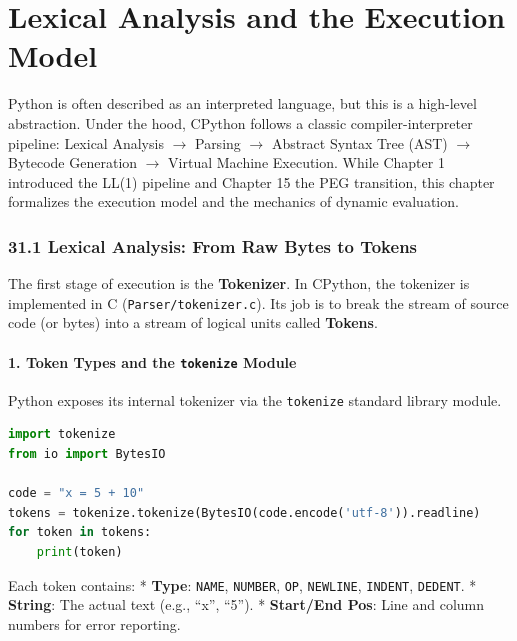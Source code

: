 \hypertarget{lexical-analysis-and-the-execution-model}{%
\chapter{Lexical Analysis and the Execution
Model}\label{lexical-analysis-and-the-execution-model}}

Python is often described as an interpreted language, but this is a
high-level abstraction. Under the hood, CPython follows a classic
compiler-interpreter pipeline: Lexical Analysis \(\rightarrow\) Parsing
\(\rightarrow\) Abstract Syntax Tree (AST) \(\rightarrow\) Bytecode
Generation \(\rightarrow\) Virtual Machine Execution. While Chapter 1
introduced the LL(1) pipeline and Chapter 15 the PEG transition, this
chapter formalizes the execution model and the mechanics of dynamic
evaluation.

\hypertarget{lexical-analysis-from-raw-bytes-to-tokens}{%
\subsection{31.1 Lexical Analysis: From Raw Bytes to
Tokens}\label{lexical-analysis-from-raw-bytes-to-tokens}}

The first stage of execution is the \textbf{Tokenizer}. In CPython, the
tokenizer is implemented in C
(\passthrough{\lstinline!Parser/tokenizer.c!}). Its job is to break the
stream of source code (or bytes) into a stream of logical units called
\textbf{Tokens}.

\hypertarget{token-types-and-the-tokenize-module}{%
\subsubsection{\texorpdfstring{1. Token Types and the \texttt{tokenize}
Module}{1. Token Types and the tokenize Module}}\label{token-types-and-the-tokenize-module}}

Python exposes its internal tokenizer via the
\passthrough{\lstinline!tokenize!} standard library module.

\begin{lstlisting}[language=Python]
import tokenize
from io import BytesIO

code = "x = 5 + 10"
tokens = tokenize.tokenize(BytesIO(code.encode('utf-8')).readline)
for token in tokens:
    print(token)
\end{lstlisting}

Each token contains: * \textbf{Type}: \passthrough{\lstinline!NAME!},
\passthrough{\lstinline!NUMBER!}, \passthrough{\lstinline!OP!},
\passthrough{\lstinline!NEWLINE!}, \passthrough{\lstinline!INDENT!},
\passthrough{\lstinline!DEDENT!}. * \textbf{String}: The actual text
(e.g., ``x'', ``5''). * \textbf{Start/End Pos}: Line and column numbers
for error reporting.

